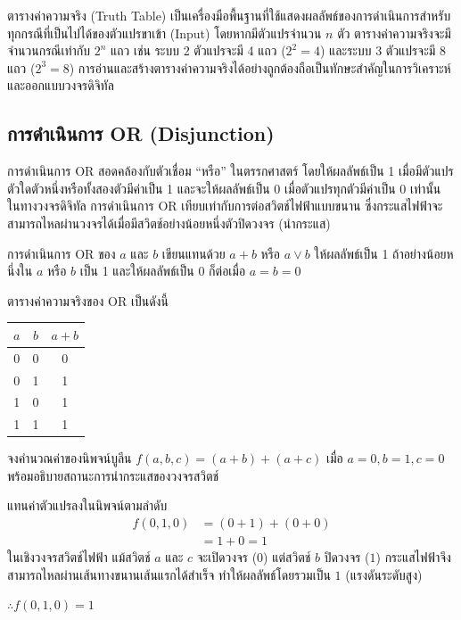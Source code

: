 ตารางค่าความจริง (Truth Table) เป็นเครื่องมือพื้นฐานที่ใช้แสดงผลลัพธ์ของการดำเนินการสำหรับทุกกรณีที่เป็นไปได้ของตัวแปรขาเข้า (Input) โดยหากมีตัวแปรจำนวน $n$ ตัว ตารางค่าความจริงจะมีจำนวนกรณีเท่ากับ $2^n$ แถว เช่น ระบบ 2 ตัวแปรจะมี 4 แถว ($2^2 = 4$) และระบบ 3 ตัวแปรจะมี 8 แถว ($2^3 = 8$) การอ่านและสร้างตารางค่าความจริงได้อย่างถูกต้องถือเป็นทักษะสำคัญในการวิเคราะห์และออกแบบวงจรดิจิทัล

\subsection{การดำเนินการ OR (Disjunction)}
การดำเนินการ OR สอดคล้องกับตัวเชื่อม ``หรือ'' ในตรรกศาสตร์ โดยให้ผลลัพธ์เป็น 1 เมื่อมีตัวแปรตัวใดตัวหนึ่งหรือทั้งสองตัวมีค่าเป็น 1 และจะให้ผลลัพธ์เป็น 0 เมื่อตัวแปรทุกตัวมีค่าเป็น 0 เท่านั้น ในทางวงจรดิจิทัล การดำเนินการ OR เทียบเท่ากับการต่อสวิตช์ไฟฟ้าแบบขนาน ซึ่งกระแสไฟฟ้าจะสามารถไหลผ่านวงจรได้เมื่อมีสวิตช์อย่างน้อยหนึ่งตัวปิดวงจร (นำกระแส)~\parencite{mano2018digital}

\begin{definition}
การดำเนินการ OR ของ $a$ และ $b$ เขียนแทนด้วย $a + b$ หรือ $a \lor b$ ให้ผลลัพธ์เป็น 1 ถ้าอย่างน้อยหนึ่งใน $a$ หรือ $b$ เป็น 1 และให้ผลลัพธ์เป็น 0 ก็ต่อเมื่อ $a = b = 0$
\end{definition}

ตารางค่าความจริงของ OR เป็นดังนี้
\begin{center}
\begin{tabular}{|c|c|c|}
\hline
$a$ & $b$ & $a + b$ \\
\hline
0 & 0 & 0 \\
\hline
0 & 1 & 1 \\
\hline
1 & 0 & 1 \\
\hline
1 & 1 & 1 \\
\hline
\end{tabular}
\end{center}

\begin{ex}
\label{ex:eval-or-expression}
จงคำนวณค่าของนิพจน์บูลีน $f(a, b, c) = (a + b) + (a + c)$ เมื่อ $a = 0, b = 1, c = 0$ พร้อมอธิบายสถานะการนำกระแสของวงจรสวิตช์
\end{ex}
\begin{solution}
แทนค่าตัวแปรลงในนิพจน์ตามลำดับ
\begin{align*}
f(0, 1, 0) &= (0 + 1) + (0 + 0) \\
           &= 1 + 0 = 1
\end{align*}
ในเชิงวงจรสวิตช์ไฟฟ้า แม้สวิตช์ $a$ และ $c$ จะเปิดวงจร ($0$) แต่สวิตช์ $b$ ปิดวงจร ($1$) กระแสไฟฟ้าจึงสามารถไหลผ่านเส้นทางขนานเส้นแรกได้สำเร็จ ทำให้ผลลัพธ์โดยรวมเป็น $1$ (แรงดันระดับสูง)

$\therefore f(0,1,0) = 1$ \solhere
\end{solution}


